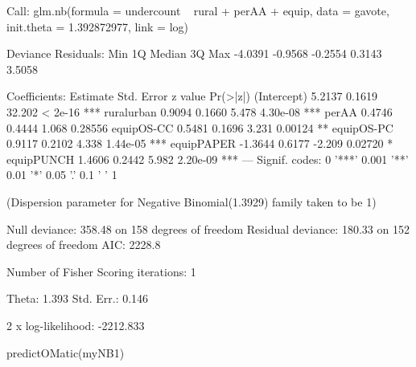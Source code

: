 \begin{Schunk}
\begin{Soutput}
Call:
glm.nb(formula = undercount ~ rural + perAA + equip, data = gavote, 
    init.theta = 1.392872977, link = log)

Deviance Residuals: 
    Min       1Q   Median       3Q      Max  
-4.0391  -0.9568  -0.2554   0.3143   3.5058  

Coefficients:
            Estimate Std. Error z value Pr(>|z|)    
(Intercept)   5.2137     0.1619  32.202  < 2e-16 ***
ruralurban    0.9094     0.1660   5.478 4.30e-08 ***
perAA         0.4746     0.4444   1.068  0.28556    
equipOS-CC    0.5481     0.1696   3.231  0.00124 ** 
equipOS-PC    0.9117     0.2102   4.338 1.44e-05 ***
equipPAPER   -1.3644     0.6177  -2.209  0.02720 *  
equipPUNCH    1.4606     0.2442   5.982 2.20e-09 ***
---
Signif. codes:  0 '***' 0.001 '**' 0.01 '*' 0.05 '.' 0.1 ' ' 1

(Dispersion parameter for Negative Binomial(1.3929) family taken to be 1)

    Null deviance: 358.48  on 158  degrees of freedom
Residual deviance: 180.33  on 152  degrees of freedom
AIC: 2228.8

Number of Fisher Scoring iterations: 1


              Theta:  1.393 
          Std. Err.:  0.146 

 2 x log-likelihood:  -2212.833 
\end{Soutput}
\begin{Sinput}
 predictOMatic(myNB1)
\end{Sinput}
\end{Schunk}
